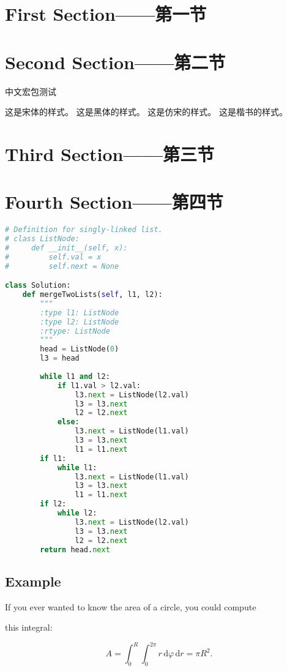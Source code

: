 \documentclass{tsnotes}
\begin{document}

\section{First Section——第一节}
\lipsum[1]


\section{Second Section——第二节}
中文宏包测试               \par 
{\songti   这是宋体的样式。} 
{\heiti    这是黑体的样式。} 
{\fangsong 这是仿宋的样式。} 
{\kaishu   这是楷书的样式。} \par

\section{Third Section——第三节}
\lipsum[1-2]
\section{Fourth Section——第四节}
\begin{lstlisting}[title=代码块1,language=Python]
# Definition for singly-linked list.
# class ListNode:
#     def __init__(self, x):
#         self.val = x
#         self.next = None

class Solution:
    def mergeTwoLists(self, l1, l2):
        """
        :type l1: ListNode
        :type l2: ListNode
        :rtype: ListNode
        """
        head = ListNode(0)
        l3 = head
        
        while l1 and l2:
            if l1.val > l2.val:
                l3.next = ListNode(l2.val)
                l3 = l3.next
                l2 = l2.next
            else:
                l3.next = ListNode(l1.val)
                l3 = l3.next
                l1 = l1.next
        if l1:
            while l1:
                l3.next = ListNode(l1.val)
                l3 = l3.next
                l1 = l1.next
        if l2:
            while l2:
                l3.next = ListNode(l2.val)
                l3 = l3.next
                l2 = l2.next
        return head.next
\end{lstlisting}


\subsection*{Example}

If you ever wanted to know the area of a circle, you could compute


this integral:

\begin{equation}
  A = \int_0^R \int_0^{2\pi} r \,\mathrm{d}\varphi\,\mathrm{d}r
    = \pi R^2.
\end{equation}

\end{document}
